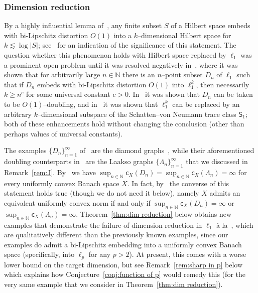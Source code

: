 \documentclass[11pt,reqno]{amsart}
\newcommand{\N}{\mathbb{N}}
\newcommand{\cc}{{\mathsf{c}}}
\newcommand{\0}{\mathbf{0}}
\renewcommand{\1}{\mathbf 1}
\renewcommand{\ge}{\geqslant}
\theoremstyle{remark}
\begin{document}
\subsubsection{Dimension reduction}\label{sec:dim reduction} By a highly influential lemma of~\cite{JL84}, any finite subset $S$ of a Hilbert space embeds with bi-Lipschitz distortion $O(1)$ into a $k$--dimensional Hilbert space for $k\lesssim \log |S|$; see~\cite{Nao18} for an indication of the significance of this statement. The question whether this phenomenon holds with Hilbert space replaced by $\ell_1$ was a prominent open problem until it was resolved negatively in~\cite{BC05}, where it was shown that for  arbitrarily large $n\in \N$ there is an $n$--point subset $D_n$ of $\ell_1$ such that if $D_n$ embeds with bi-Lipschitz distortion $O(1)$ into $\ell_1^k$, then necessarily $k\ge n^c$ for some universal constant $c>0$. In~\cite{LMN05} it was shown that $D_n$ can be taken   to be $O(1)$--doubling, and in~\cite{NPS18} it was shown that $\ell_1^k$ can be replaced by an arbitrary $k$--dimensional subspace of the Schatten--von Neumann trace class $\mathsf{S}_1$; both of these enhancements hold without changing the conclusion (other than perhaps values of universal constants).

The examples $\{D_n\}_{n=1}^\infty$ of~\cite{BC05} are the diamond graphs~\cite{NR03}, while their aforementioned doubling counterparts in~\cite{LMN05}  are the Laakso graphs $\{\Lambda_n\}_{n=1}^\infty$ that we discussed in Remark~\ref{rem:J}. By~\cite{MN-SOCG,JS09} we have $\sup_{n\in \N}\cc_X(D_n)=\sup_{n\in \N}\cc_X(\Lambda_n)=\infty$ for every uniformly convex Banach space $X$. In fact, by~\cite{JS09} the converse of this statement holds true (though we do not need it below), namely $X$ admits an equivalent uniformly convex norm if and only if $\sup_{n\in \N}\cc_X(D_n)=\infty$ or $\sup_{n\in \N}\cc_X(\Lambda_n)=\infty$. Theorem~\ref{thm:dim reduction}  below obtains new examples that demonstrate the failure of dimension reduction in $\ell_1$ à la~\cite{JL84}, which are qualitatively different than the previously known examples, since our examples do admit a bi-Lipschitz embedding into a uniformly  convex Banach space (specifically, into $\ell_p$ for any $p>2$). At present, this comes with a worse lower bound on the target dimension, but see Remark~\ref{rem:sharp in p} below which explains how Conjecture~\ref{conj:function of p} would remedy this (for the very same example that we consider in Theorem~\ref{thm:dim reduction}).
\end{document}
